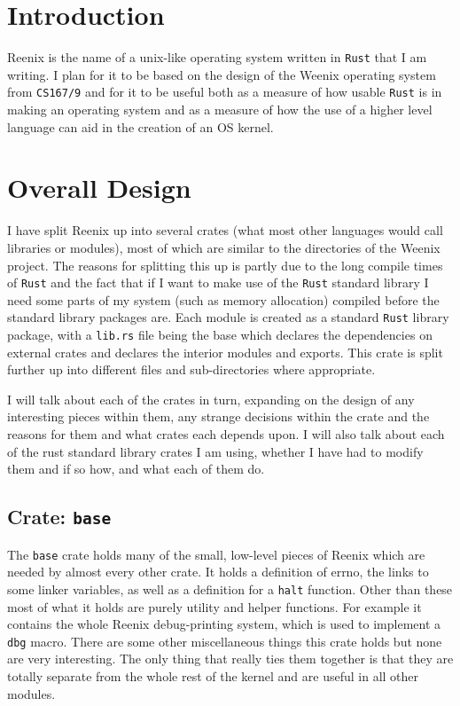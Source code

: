 \documentclass[12pt,letterpaper]{article}
\newcommand{\rust}{\texttt{Rust}}
\begin{document}
\section{Introduction}

Reenix is the name of a unix-like operating system written in \rust{}
that I am writing. I plan for it to be based on the design of the Weenix
operating system from \texttt{CS167/9} and for it to be useful both as
a measure of how usable \rust{} is in making an operating system and
as a measure of how the use of a higher level language can aid in the
creation of an OS kernel.

\section{Overall Design}
I have split Reenix up into several crates (what most other languages
would call libraries or modules), most of which are similar to the
directories of the Weenix project. The reasons for splitting this up is
partly due to the long compile times of \rust{} and the fact that if I
want to make use of the \rust{} standard library I need some parts of my
system (such as memory allocation) compiled before the standard library
packages are. Each module is created as a standard \rust{} library
package, with a \texttt{lib.rs} file being the base which declares
the dependencies on external crates and declares the interior modules
and exports. This crate is split further up into different files and
sub-directories where appropriate.

I will talk about each of the crates in turn, expanding on the design
of any interesting pieces within them, any strange decisions within the
crate and the reasons for them and what crates each depends upon. I will
also talk about each of the rust standard library crates I am using,
whether I have had to modify them and if so how, and what each of them do.


\subsection{Crate: \texttt{base}}
The \texttt{base} crate holds many of the small, low-level pieces
of Reenix which are needed by almost every other crate. It holds a
definition of errno, the links to some linker variables, as well as a
definition for a \texttt{halt} function. Other than these most of what it
holds are purely utility and helper functions. For example it contains
the whole Reenix debug-printing system, which is used to implement a
\texttt{dbg} macro. There are some other miscellaneous things this crate
holds but none are very interesting. The only thing that really ties
them together is that they are totally separate from the whole rest of
the kernel and are useful in all other modules.
\end{document}
